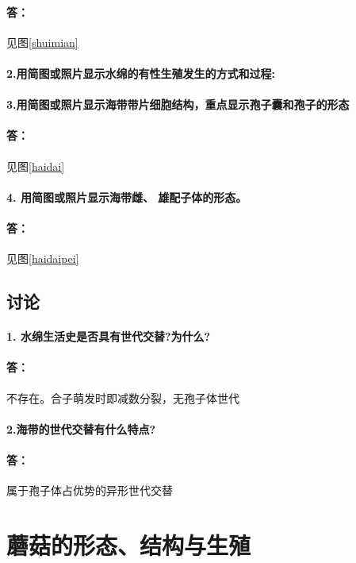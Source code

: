 \documentclass[UTF8]{ctexart}
\begin{document}
            \paragraph*{答：}见图\ref{shuimian}
            \paragraph*{2.用简图或照片显示水绵的有性生殖发生的方式和过程:}

            \paragraph*{3.用简图或照片显示海带带片细胞结构，重点显示孢子囊和孢子的形态}
                
            \paragraph*{答：}见图\ref{haidai}
            \paragraph*{4. 用简图或照片显示海带雌、 雄配子体的形态。}
            \paragraph*{答：}见图\ref{haidaipei}
        \subsection*{讨论}
            \paragraph*{1. 水绵生活史是否具有世代交替?为什么?}
            \paragraph*{答：}不存在。合子萌发时即减数分裂，无孢子体世代
            \paragraph*{2.海带的世代交替有什么特点?}
            \paragraph*{答：}属于孢子体占优势的异形世代交替
    \section{蘑菇的形态、结构与生殖}
\end{document}

